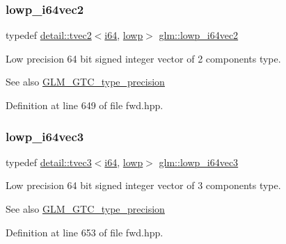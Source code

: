 \subsubsection{\texorpdfstring{lowp\+\_\+i64vec2}{lowp\_i64vec2}}
{\footnotesize\ttfamily typedef \hyperlink{structglm_1_1detail_1_1tvec2}{detail\+::tvec2}$<$\hyperlink{group__gtc__type__precision_gac7a7eaad46064fc952b06df33689da23}{i64}, \hyperlink{namespaceglm_a0f04f086094c747d227af4425893f545ae161af3fc695e696ce3bf69f7332bc2d}{lowp}$>$ \hyperlink{group__gtc__type__precision_gad88a04aaa07fabf57fdbad8e6b7bcc9c}{glm\+::lowp\+\_\+i64vec2}}

Low precision 64 bit signed integer vector of 2 components type. \begin{DoxySeeAlso}{See also}
\hyperlink{group__gtc__type__precision}{G\+L\+M\+\_\+\+G\+T\+C\+\_\+type\+\_\+precision} 
\end{DoxySeeAlso}


Definition at line 649 of file fwd.\+hpp.

\mbox{\label{group__gtc__type__precision_gaa42f666ccdb6d1ef6326882b4f377678}} 
\subsubsection{\texorpdfstring{lowp\+\_\+i64vec3}{lowp\_i64vec3}}
{\footnotesize\ttfamily typedef \hyperlink{structglm_1_1detail_1_1tvec3}{detail\+::tvec3}$<$\hyperlink{group__gtc__type__precision_gac7a7eaad46064fc952b06df33689da23}{i64}, \hyperlink{namespaceglm_a0f04f086094c747d227af4425893f545ae161af3fc695e696ce3bf69f7332bc2d}{lowp}$>$ \hyperlink{group__gtc__type__precision_gaa42f666ccdb6d1ef6326882b4f377678}{glm\+::lowp\+\_\+i64vec3}}

Low precision 64 bit signed integer vector of 3 components type. \begin{DoxySeeAlso}{See also}
\hyperlink{group__gtc__type__precision}{G\+L\+M\+\_\+\+G\+T\+C\+\_\+type\+\_\+precision} 
\end{DoxySeeAlso}


Definition at line 653 of file fwd.\+hpp.

\mbox{\label{group__gtc__type__precision_ga95c13b9d4f94d1783e7d96534d1651d8}} 
